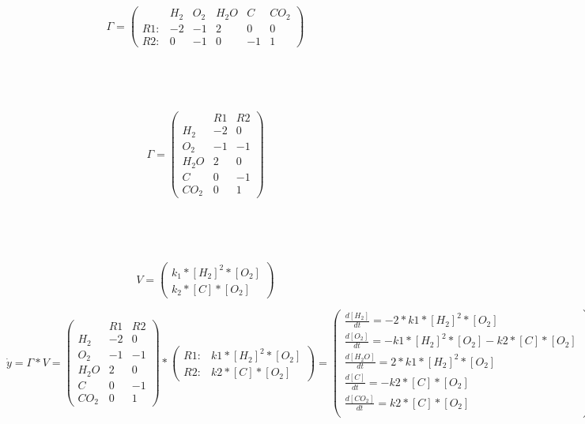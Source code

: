 \documentclass[11pt]{amsart}
\begin{document}
\

\

\[
\Gamma = 
\begin{pmatrix}
 & H_2 & O_2 & H_2O & C & CO_2\\
R1: & -2 & -1 & 2 & 0 & 0\\
R2: & 0 & -1 & 0 & -1 & 1
\end{pmatrix}
 \]

\

\
 
 \[
\Gamma = 
\begin{pmatrix}
 & R1 & R2\\
H_2 &  -2 & 0\\
O_2 &  -1 & -1\\
H_2O &  2 & 0\\
C &  0 & -1\\
CO_2 &  0 & 1
\end{pmatrix}
 \]

\

\
 
\[
V = 
\begin{pmatrix}
k_1*[H_2]^2*[O_2]\\
k_2*[C]*[O_2]
\end{pmatrix}
 \]
 
 \[{\dot  {y}} 
 = \Gamma *V 
 =  \begin{pmatrix}
 & R1 & R2\\
H_2 &  -2 & 0\\
O_2 &  -1 & -1\\
H_2O &  2 & 0\\
C &  0 & -1\\
CO_2 &  0 & 1
\end{pmatrix} * 
\begin{pmatrix}
R1: & k1*[H_2]^2*[O_2]\\
R2: & k2*[C]*[O_2]
\end{pmatrix} 
=\left({\begin{array}{c}{\frac  {d[H_2]}{dt}=  -2*k1*[H_2]^2*[O_2]}\\[6pt]{\frac  {d[O_2]}{dt} = -k1*[H_2]^2*[O_2] - k2*[C]*[O_2]}\\[6pt]{\frac  {d[H_2O]}{dt} =  2*k1*[H_2]^2*[O_2]}\\[6pt]{\frac  {d[C]}{dt} =  - k2*[C]*[O_2]}\\[6pt]{\frac  {d[CO_2]}{dt} =  k2*[C]*[O_2]}\\[6pt] \end{array}}\right)\]


\

\
\end{document}
